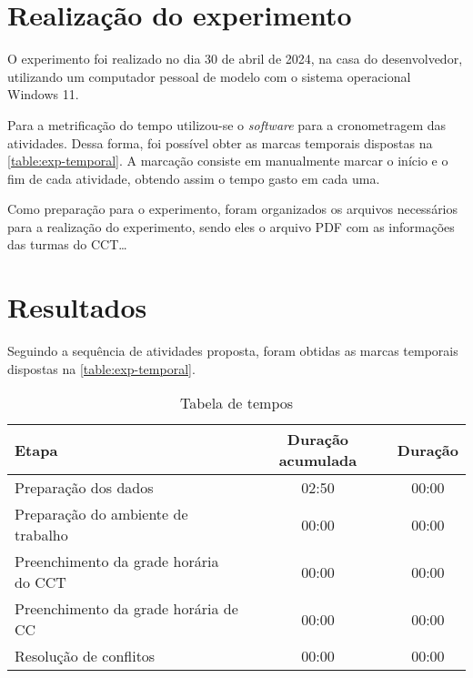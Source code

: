 \section{Realização do experimento}

O experimento foi realizado no dia 30 de abril de 2024, na casa do desenvolvedor, utilizando um computador pessoal de modelo  com o sistema operacional Windows 11.

Para a metrificação do tempo utilizou-se o \textit{software}  para a cronometragem das atividades. Dessa forma, foi possível obter as marcas temporais dispostas na \autoref{table:exp-temporal}. A marcação consiste em manualmente marcar o início e o fim de cada atividade, obtendo assim o tempo gasto em cada uma.

Como preparação para o experimento, foram organizados os arquivos necessários para a realização do experimento, sendo eles o arquivo PDF com as informações das turmas do CCT\dots

\section{Resultados}

Seguindo a sequência de atividades proposta, foram obtidas as marcas temporais dispostas na \autoref{table:exp-temporal}.

\begin{table}[htbp]\centering
  \caption{Tabela de tempos}
  \label{table:exp-temporal}
  \begin{tabular}{| l c c |}
    \hline
    \textbf{Etapa}                        & \textbf{Duração acumulada} & \textbf{Duração} \\
    \hline
    Preparação dos dados                  & 02:50                      & 00:00            \\
    Preparação do ambiente de trabalho    & 00:00                      & 00:00            \\
    Preenchimento da grade horária do CCT & 00:00                      & 00:00            \\
    Preenchimento da grade horária de CC  & 00:00                      & 00:00            \\
    Resolução de conflitos                & 00:00                      & 00:00            \\
    \hline
  \end{tabular}
\end{table}


